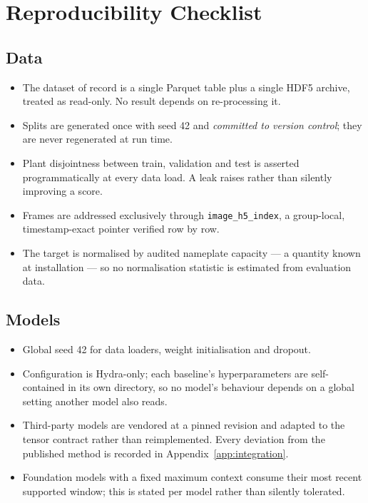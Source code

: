 \chapter{Reproducibility Checklist}
\label{app:repro}

\section{Data}

\begin{itemize}
  \item The dataset of record is a single Parquet table plus a single HDF5 archive,
    treated as read-only. No result depends on re-processing it.
  \item Splits are generated once with seed 42 and \emph{committed to version control};
    they are never regenerated at run time.
  \item Plant disjointness between train, validation and test is asserted
    programmatically at every data load. A leak raises rather than silently improving a
    score.
  \item Frames are addressed exclusively through \texttt{image\_h5\_index}, a group-local,
    timestamp-exact pointer verified row by row.
  \item The target is normalised by audited nameplate capacity --- a quantity known at
    installation --- so no normalisation statistic is estimated from evaluation data.
\end{itemize}

\section{Models}

\begin{itemize}
  \item Global seed 42 for data loaders, weight initialisation and dropout.
  \item Configuration is Hydra-only; each baseline's hyperparameters are self-contained in
    its own directory, so no model's behaviour depends on a global setting another model
    also reads.
  \item Third-party models are vendored at a pinned revision and adapted to the tensor
    contract rather than reimplemented. Every deviation from the published method is
    recorded in Appendix~\ref{app:integration}.
  \item Foundation models with a fixed maximum context consume their most recent supported
    window; this is stated per model rather than silently tolerated.
\end{itemize}

